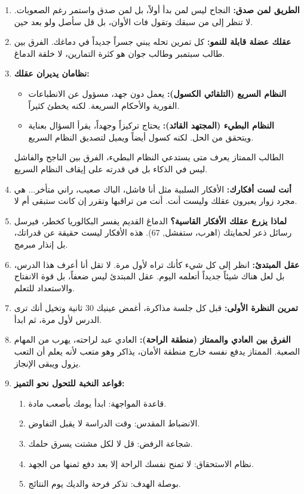 \documentclass[12pt,a4paper]{book}
\begin{document}
	\begin{enumerate}
		
		\item \textbf{الطريق لمن صدق:} النجاح ليس لمن بدأ أولاً، بل لمن صدق واستمر رغم الصعوبات. لا تنظر إلى من سبقك وتقول فات الأوان، بل قل سأصل ولو بعد حين.
		
		\item \textbf{عقلك عضلة قابلة للنمو:} كل تمرين تحله يبني جسراً جديداً في دماغك. الفرق بين طالب سبتمبر وطالب جوان هو كثرة التمارين، لا خلقة الدماغ.
		
		\item \textbf{نظامان يديران عقلك:}
		\begin{itemize}
			\item \textbf{النظام السريع (التلقائي الكسول):} يعمل دون جهد، مسؤول عن الانطباعات الفورية والأحكام السريعة. لكنه يخطئ كثيراً.
			\item \textbf{النظام البطيء (المجتهد القائد):} يحتاج تركيزاً وجهداً، يقرأ السؤال بعناية ويتحقق من الحل. لكنه كسول أيضاً ويميل لتصديق النظام السريع.
		\end{itemize}
		الطالب الممتاز يعرف متى يستدعي النظام البطيء، الفرق بين الناجح والفاشل ليس في الذكاء بل في قدرته على إيقاف النظام السريع.
		
		\item \textbf{أنت لست أفكارك:} الأفكار السلبية مثل أنا فاشل، الباك صعيب، راني متأخر... هي مجرد زوار يعبرون عقلك وليست أنت. أنت من تراقبها وتقرر إن كانت ستبقى أم لا.
		
		\item \textbf{لماذا يزرع عقلك الأفكار القاسية؟} الدماغ القديم يفسر البكالوريا كخطر، فيرسل رسائل ذعر لحمايتك (اهرب، ستفشل, 67). هذه الأفكار ليست حقيقة عن قدراتك، بل إنذار مبرمج.
		
		\item \textbf{عقل المبتدئ:} انظر إلى كل شيء كأنك تراه لأول مرة. لا تقل أنا أعرف هذا الدرس، بل لعل هناك شيئاً جديداً أتعلمه اليوم. عقل المبتدئ ليس ضعفاً، بل قوة الانفتاح والاستعداد للتعلم.
		
		\item \textbf{تمرين النظرة الأولى:} قبل كل جلسة مذاكرة، أغمض عينيك 30 ثانية وتخيل أنك ترى الدرس لأول مرة، ثم ابدأ.
		
		\item \textbf{الفرق بين العادي والممتاز (منطقة الراحة):} العادي عبد لراحته، يهرب من المهام الصعبة. الممتاز يدفع نفسه خارج منطقة الأمان، يذاكر وهو متعب لأنه يعلم أن التعب يزول ويبقى الإنجاز.
		
		\item \textbf{قواعد النخبة للتحول نحو التميز:}
		\begin{enumerate}
			\item قاعدة المواجهة: ابدأ يومك بأصعب مادة.
			\item الانضباط المقدس: وقت الدراسة لا يقبل التفاوض.
			\item شجاعة الرفض: قل لا لكل مشتت يسرق حلمك.
			\item نظام الاستحقاق: لا تمنح نفسك الراحة إلا بعد دفع ثمنها من الجهد.
			\item بوصلة الهدف: تذكر فرحة والديك يوم النتائج.
		\end{enumerate}
		

\end{enumerate}
\end{document}
